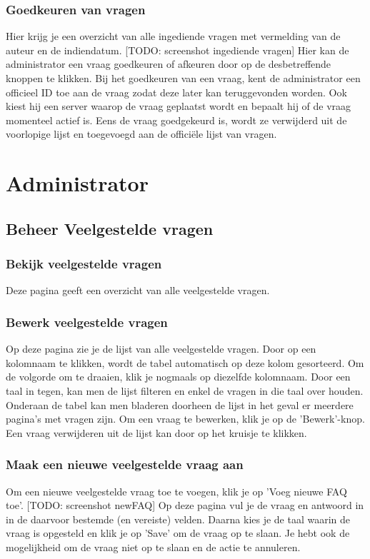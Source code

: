 \documentclass[]{article}
\begin{document}
\subsubsection{Goedkeuren van vragen}
Hier krijg je een overzicht van alle ingediende vragen met vermelding van de auteur en de indiendatum. [TODO: screenshot ingediende vragen] Hier kan de administrator een vraag goedkeuren of afkeuren door op de desbetreffende knoppen te klikken. Bij het goedkeuren van een vraag, kent de administrator een officieel ID toe aan de vraag zodat deze later kan teruggevonden worden. Ook kiest hij een server waarop de vraag geplaatst wordt en bepaalt hij of de vraag momenteel actief is. Eens de vraag goedgekeurd is, wordt ze verwijderd uit de voorlopige lijst en toegevoegd aan de officiële lijst van vragen.

\section{Administrator}

\subsection{Beheer Veelgestelde vragen}

\subsubsection{Bekijk veelgestelde vragen}
Deze pagina geeft een overzicht van alle veelgestelde vragen.

\subsubsection{Bewerk veelgestelde vragen}
Op deze pagina zie je de lijst van alle veelgestelde vragen. Door op een kolomnaam te klikken, wordt de tabel automatisch op deze kolom gesorteerd. Om de volgorde om te draaien, klik je nogmaals op diezelfde kolomnaam. Door een taal in tegen, kan men de lijst filteren en enkel de vragen in die taal over houden. Onderaan de tabel kan men bladeren doorheen de lijst in het geval er meerdere pagina's met vragen zijn. Om een vraag te bewerken, klik je op de 'Bewerk'-knop. Een vraag verwijderen uit de lijst kan door op het kruisje te klikken.

\subsubsection{Maak een nieuwe veelgestelde vraag aan}
Om een nieuwe veelgestelde vraag toe te voegen, klik je op 'Voeg nieuwe FAQ toe'. [TODO: screenshot newFAQ] Op deze pagina vul je de vraag en antwoord in in de daarvoor bestemde (en vereiste) velden. Daarna kies je de taal waarin de vraag is opgesteld en klik je op 'Save' om de vraag op te slaan. Je hebt ook de mogelijkheid om de vraag niet op te slaan en de actie te annuleren.
\end{document}
